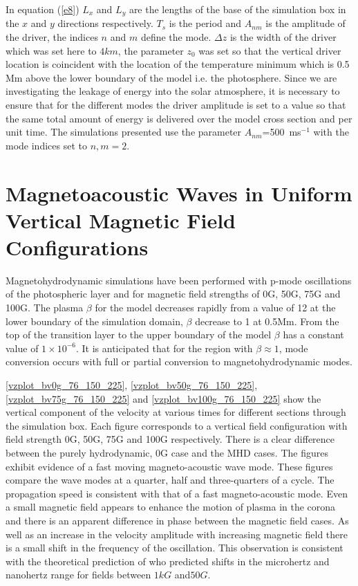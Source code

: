 \documentclass[twocolumn]{aastex62}
\begin{document}
In equation (\ref{e8}) $L_{x}$ and $L_{y}$ are the lengths of the base of the simulation box in the $x$ and $y$ directions respectively. $T_{s}$ is the period and $A_{nm}$ is the amplitude of the driver, the indices $n$ and $m$ define the mode. $\Delta z$ is the width of the driver which was set here to $4km$, the parameter $z_{0}$ was set so that the vertical driver location is coincident with the location of the temperature minimum which is 0.5 Mm above the lower boundary of the model i.e. the photosphere.   Since we are investigating the leakage of energy into the solar atmosphere, it is necessary to ensure that for the different modes the driver amplitude is set to a value so that the same total amount of energy is delivered over the model cross section and per unit time.  The simulations presented use the parameter $A_{nm}$=500\, ms$^{-1}$ with the mode indices set to $n,m=2$. 




\section{Magnetoacoustic Waves in Uniform Vertical Magnetic Field Configurations}
Magnetohydrodynamic simulations have been performed with p-mode oscillations of the photospheric layer and for magnetic field strengths of 0G, 50G, 75G and 100G. The plasma $\beta$ for the model decreases rapidly from a value of 12 at the lower boundary of the simulation domain, $\beta$ decrease to 1 at 0.5Mm. From the top of the transition layer to the upper boundary of the model $\beta $ has a constant value of $1\times 10^{-6}$. It is anticipated that for the region with $\beta \approx 1$, mode conversion occurs with full or partial conversion to magnetohydrodynamic modes. 

\ref{vzplot_bv0g_76_150_225}, \ref{vzplot_bv50g_76_150_225}, \ref{vzplot_bv75g_76_150_225} and \ref{vzplot_bv100g_76_150_225} show the vertical component of the velocity at various times for different sections through the simulation box. Each figure corresponds to a vertical field configuration with field strength 0G, 50G, 75G and 100G respectively. There is a clear difference between the purely hydrodynamic, 0G case and the MHD cases. The figures exhibit evidence of a fast moving magneto-acoustic wave mode. These figures compare the wave modes at a quarter, half and three-quarters of a cycle. The propagation speed is consistent with that of a fast magneto-acoustic mode. Even a small magnetic field appears to enhance the motion of plasma in the corona and  there is an apparent difference in phase between the magnetic field cases. As well as an increase in the velocity amplitude with increasing magnetic field there is a small shift in the frequency of the oscillation. This observation is consistent with the theoretical prediction of \citet{Hindman1996} who predicted shifts in the microhertz and nanohertz range for fields between $1kG$ and$50G$. 
\end{document}
